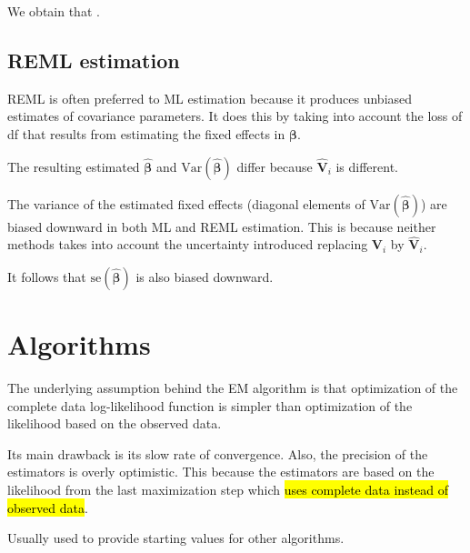 \documentclass[english]{article}
\begin{document}
\begin{multicols*}{2}
\bigskip

We obtain that .

\subsection{REML estimation}
REML is often preferred to ML estimation because it produces unbiased estimates of covariance parameters. It does this by taking into account the loss of df that results from estimating the fixed effects in $\bm{\beta}$.

\bigskip

The resulting estimated $\hat{\bm{\beta}}$ and $\text{Var}(\hat{\bm{\beta}})$ differ because $\hat{\bm{V}}_{i}$ is different. 

\begin{rappel_enhanced}[Context]
The variance of the estimated fixed effects (diagonal elements of $\text{Var}(\hat{\bm{\beta}})$) are biased downward in both ML and REML estimation. This is because neither methods takes into account the uncertainty introduced replacing $\bm{V}_{i}$ by $\hat{\bm{V}}_{i}$.

\bigskip

It follows that $\text{se}(\hat{\bm{\beta}})$ is also biased downward.
\end{rappel_enhanced}


\columnbreak
\section{Algorithms}\label{sec:BAlgorithms}
\begin{definitionNOHFILL}
The underlying assumption behind the EM algorithm is that optimization of the complete data log-likelihood function is simpler than optimization of the likelihood based on the observed data.

\bigskip

Its main drawback is its slow rate of convergence. Also, the precision of the estimators is overly optimistic. This because the estimators are based on the likelihood from the last maximization step which \hl{uses complete data instead of observed data}. 

\bigskip

Usually used to provide starting values for other algorithms.
\end{definitionNOHFILL}



\end{multicols*}
\end{document}
